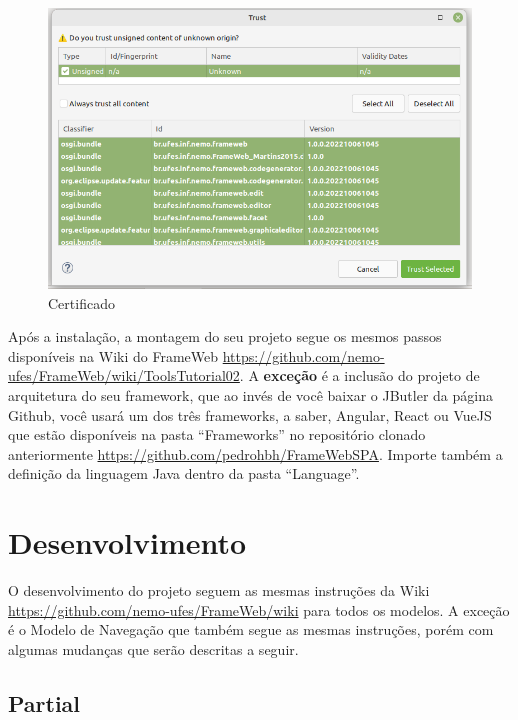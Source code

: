 \documentclass[
article,			%
11pt,				%
oneside,			%
a4paper,			%
english,			%
brazil,				%
sumario=tradicional
]{abntex2}
\begin{document}
\begin{figure}
	\centering
	\includegraphics[width=0.7\linewidth]{figuras/certificado}
	\caption{Certificado}
	\label{fig:certificado}
\end{figure}


Após a instalação, a montagem do seu projeto segue os mesmos passos disponíveis na Wiki do FrameWeb \url{https://github.com/nemo-ufes/FrameWeb/wiki/ToolsTutorial02}. A \textbf{exceção} é a inclusão do projeto de arquitetura do seu framework, que ao invés de você baixar o JButler da página Github, você usará um dos três frameworks, a saber, Angular, React ou VueJS que estão disponíveis na pasta ``Frameworks'' no repositório clonado anteriormente \url{https://github.com/pedrohbh/FrameWebSPA}. Importe também a definição da linguagem Java dentro da pasta ``Language''.





\section{Desenvolvimento}
O desenvolvimento do projeto seguem as mesmas instruções da Wiki \url{https://github.com/nemo-ufes/FrameWeb/wiki} para todos os modelos. A exceção é o Modelo de Navegação que também segue as mesmas instruções, porém com algumas mudanças que serão descritas a seguir.
	
\subsection{Partial}
\end{document}
